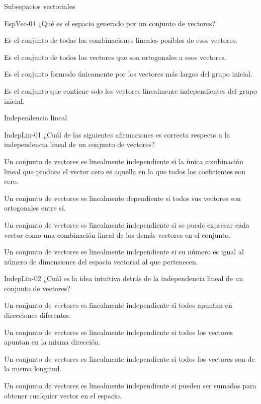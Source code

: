 \documentclass[a4,11pt]{aleph-notas}
\begin{document}
\begin{quiz}{Subespacios vectoriales}
\begin{multi}[]%
    {EspVec-04}
    ¿Qué es el espacio generado por un conjunto de vectores?
    \item* Es el conjunto de todas las combinaciones lineales posibles de esos vectores.
    \item Es el conjunto de todos los vectores que son ortogonales a esos vectores.
    \item Es el conjunto formado únicamente por los vectores más largos del grupo inicial.
    \item Es el conjunto que contiene solo los vectores linealmente independientes del grupo inicial.
\end{multi}


\end{quiz}

\begin{quiz}{Independencia lineal}

\begin{multi}[]%
    {IndepLin-01}
    ¿Cuál de las siguientes afirmaciones es correcta respecto a la independencia lineal de un conjunto de vectores?
    \item* Un conjunto de vectores es linealmente independiente si la única combinación lineal que produce el vector cero es aquella en la que todos los coeficientes son cero.
    \item Un conjunto de vectores es linealmente dependiente si todos sus vectores son ortogonales entre sí.
    \item Un conjunto de vectores es linealmente independiente si se puede expresar cada vector como una combinación lineal de los demás vectores en el conjunto.
    \item Un conjunto de vectores es linealmente independiente si su número es igual al número de dimensiones del espacio vectorial al que pertenecen.
\end{multi}

\begin{multi}[]%
    {IndepLin-02}
    ¿Cuál es la idea intuitiva detrás de la independencia lineal de un conjunto de vectores?
    \item* Un conjunto de vectores es linealmente independiente si todos apuntan en direcciones diferentes.
    \item Un conjunto de vectores es linealmente independiente si todos los vectores apuntan en la misma dirección.
    \item Un conjunto de vectores es linealmente independiente si todos los vectores son de la misma longitud.
    \item Un conjunto de vectores es linealmente independiente si pueden ser sumados para obtener cualquier vector en el espacio.
\end{multi}


\end{quiz}
\end{document}
